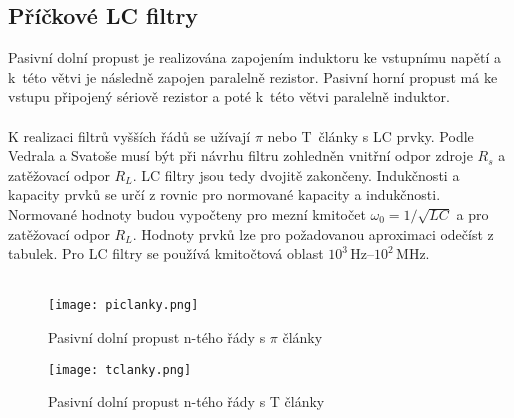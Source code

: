 \subsection{Příčkové LC filtry}\label{s:LC}
Pasivní dolní propust je realizována zapojením induktoru ke vstupnímu napětí a k~této větvi je následně zapojen paralelně rezistor. Pasivní horní propust má ke vstupu připojený sériově rezistor a poté k~této větvi paralelně induktor. \\
\\
K realizaci filtrů vyšších řádů se užívají $\pi$ nebo T~články s LC prvky. Podle Vedrala a Svatoše \cite{8} musí být při návrhu filtru zohledněn vnitřní odpor zdroje $R_s$ a zatěžovací odpor $R_L$. LC filtry jsou tedy dvojitě zakončeny. Indukčnosti a kapacity prvků se určí z rovnic pro normované kapacity a indukčnosti. Normované hodnoty budou vypočteny pro mezní kmitočet $\omega _0 = 1/\sqrt{LC}$ a pro zatěžovací odpor $R_L$. Hodnoty prvků lze pro požadovanou aproximaci odečíst z tabulek. Pro LC filtry se používá kmitočtová oblast $10^{3}$\,Hz--$10^{2}$\,MHz.\\
\\
\begin{figure}[h]
\centering
\texttt{[image: piclanky.png]}
\caption[Pasivní dolní propust n-tého řády s $\pi$ články]{Pasivní dolní propust n-tého řády s $\pi$ články \cite{8}}
\end{figure}
\begin{figure}[h]
\centering
\texttt{[image: tclanky.png]}
\caption[Pasivní dolní propust n-tého řády s T články]{Pasivní dolní propust n-tého řády s T články \cite{8}}
\end{figure}
